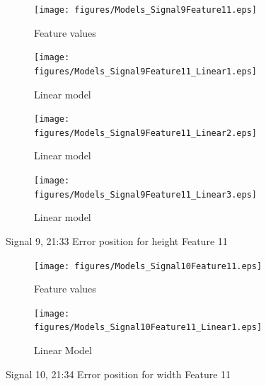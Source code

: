 \documentclass[]{article}
\begin{document}
\begin{figure}[H]
	\captionsetup[subfigure]{justification=Centering}
    \centering
		\begin{subfigure}{.45\textwidth}
		  \centering
    			\texttt{[image: figures/Models\_Signal9Feature11.eps]}
		  	\caption{Feature values}
		  	\label{fig:Models_Signal9Feature11}
		\end{subfigure}\hspace{\fill} %
		\begin{subfigure}{.45\textwidth}
		  \centering
 		   	\texttt{[image: figures/Models\_Signal9Feature11\_Linear1.eps]}
		  	\caption{Linear model}
		  	\label{fig:Models_Signal9Feature11_Linear1}
		\end{subfigure}
		\bigskip
		\begin{subfigure}{.45\textwidth}
		  \centering
    			\texttt{[image: figures/Models\_Signal9Feature11\_Linear2.eps]}
		  	\caption{Linear model}
		  	\label{fig:Models_Signal9Feature11_Linear2}
		\end{subfigure}\hspace{\fill} %
		\begin{subfigure}{.45\textwidth}
		  \centering
 		   	\texttt{[image: figures/Models\_Signal9Feature11\_Linear3.eps]}
		  	\caption{Linear model}
		  	\label{fig:Models_Signal9Feature11_Linear3}
		\end{subfigure}
    \caption{Signal 9, 21:33 Error position for height Feature 11}
    \label{fig:Models_Signal9Feature11_Caption}
\end{figure}

\begin{figure}[H]
    \centering
		\begin{subfigure}{.5\textwidth}
		  \centering
    			\texttt{[image: figures/Models\_Signal10Feature11.eps]}
		  	\caption{Feature values}
		  	\label{fig:Models_Signal10Feature7}
		\end{subfigure}%
		\begin{subfigure}{.5\textwidth}
		  \centering
 		   	\texttt{[image: figures/Models\_Signal10Feature11\_Linear1.eps]}
		  	\caption{Linear Model}
		  	\label{fig:Models_Signal10Feature11_Linear1}
		\end{subfigure}
    \caption{Signal 10, 21:34 Error position for width Feature 11}
    \label{fig:Models_Signal10Feature11_Caption}
\end{figure}
\end{document}
